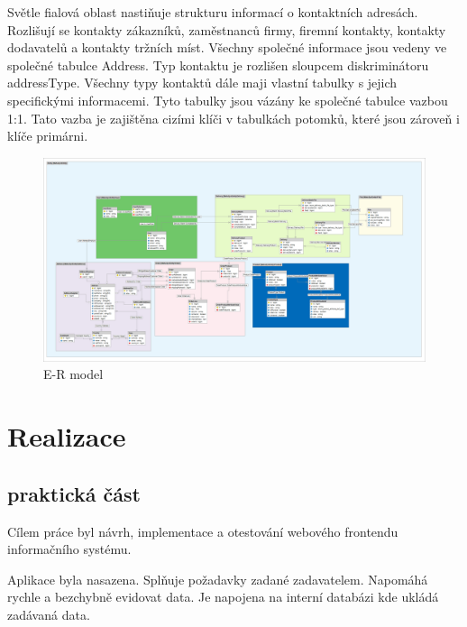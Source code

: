 \documentclass[thesis=B,czech]{FITthesis}[2012/06/26]
\begin{document}
	Světle fialová oblast nastiňuje strukturu informací o kontaktních adresách. Rozlišují se kontakty zákazníků, zaměstnanců firmy, firemní kontakty, kontakty dodavatelů a kontakty tržních míst. Všechny společné informace jsou vedeny ve společné tabulce Address. Typ kontaktu je rozlišen sloupcem diskriminátoru addressType. Všechny typy kontaktů dále maji vlastní tabulky s jejich specifickými informacemi. Tyto tabulky jsou vázány ke společné tabulce vazbou 1:1. Tato vazba je zajištěna cizími klíči v tabulkách potomků, které jsou zároveň i klíče primárni.

\begin{figure}
	\includegraphics[width=500pt, height=\textwidth, angle=90]{mahasys_ermodel.png}
	\caption{E-R model}\label{er_model}
\end{figure}

\chapter{Realizace}

\section{praktická část}

\begin{conclusion}
	Cílem práce byl návrh, implementace a otestování webového frontendu informačního systému.
	
	Aplikace byla nasazena. Splňuje požadavky zadané zadavatelem. Napomáhá rychle a bezchybně evidovat data. Je napojena na interní databázi kde ukládá zadávaná data.
\end{conclusion}
\end{document}
